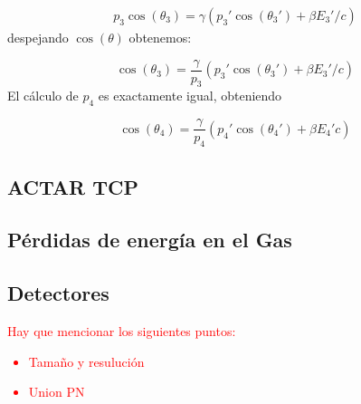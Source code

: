 \begin{eqnarray}
    p_3 \cos (\theta_3) = \gamma (p_3' \cos (\theta_3')+\beta E_3'/c)
\end{eqnarray}
despejando $\cos (\theta)$ obtenemos:

\begin{equation}
    \cos (\theta_3) = \frac{\gamma}{p_3} (p_3' \cos (\theta_3')+\beta E_3'/c)
\end{equation}
El cálculo de $p_4$ es exactamente igual, obteniendo


\begin{equation}
    \cos (\theta_4) = \frac{\gamma}{p_4} (p_4' \cos (\theta_4')+\beta E_4'c)
\end{equation}


\subsection{ACTAR TCP}

\subsection{Pérdidas de energía en el Gas}

\subsection{Detectores}


\begin{Anotacion}
    \textcolor{red}{Hay que mencionar los siguientes puntos: 
    \begin{itemize}
        \item Tamaño y resulución
        \item Union PN 
    \end{itemize}
    }
\end{Anotacion}
